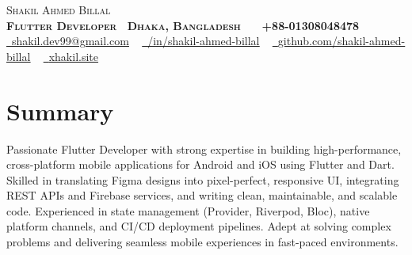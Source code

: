 \documentclass[letterpaper,11pt]{article}
\begin{document}
\begin{center}
    {\Huge \scshape Shakil Ahmed Billal} \\[4pt]
\textbf{\Large \scshape Flutter Developer  \small \faMapMarker\ Dhaka, Bangladesh ~ \faPhone\ +88-01308048478 } \\[4pt]
    \href{mailto:shakil.dev99@gmail.com}{\faEnvelope\ \underline{shakil.dev99@gmail.com}} ~
    \href{https://bd.linkedin.com/in/shakil-ahmed-billal/}{\faLinkedin\ \underline{/in/shakil-ahmed-billal}} ~
    \href{https://github.com/shakil-ahmed-billal}{\faGithub\ \underline{github.com/shakil-ahmed-billal}} ~ 
    \href{https://xhakil.site}{\faGlobe\ \underline{xhakil.site}}
\end{center}

\section{Summary}
Passionate Flutter Developer with strong expertise in building high-performance, cross-platform mobile applications for Android and iOS using Flutter and Dart. Skilled in translating Figma designs into pixel-perfect, responsive UI, integrating REST APIs and Firebase services, and writing clean, maintainable, and scalable code. Experienced in state management (Provider, Riverpod, Bloc), native platform channels, and CI/CD deployment pipelines. Adept at solving complex problems and delivering seamless mobile experiences in fast-paced environments.

\end{document}
